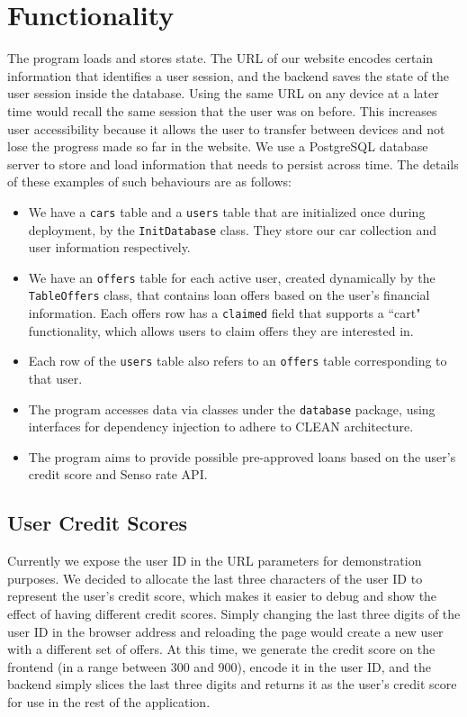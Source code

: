 \documentclass[fontsize=14pt]{article}
\begin{document}
\section*{Functionality}

The program loads and stores state. The URL of our website encodes certain information that identifies a user session, and the backend saves the state of the user session inside the database. Using the same URL on any device at a later time would recall the same session that the user was on before. This increases user accessibility because it allows the user to transfer between devices and not lose the progress made so far in the website. We use a PostgreSQL database server to store and load information that needs to persist across time.  
The details of these examples of such behaviours are as follows:   
\begin{itemize}
    \item We have a \texttt{cars} table and a \texttt{users} table that are initialized once during deployment, by the \texttt{InitDatabase} class. They store our car collection and user information respectively. 
    \item We have an \texttt{offers} table for each active user, created dynamically by the \texttt{TableOffers} class, that contains loan offers based on the user's financial information. Each offers row has a \texttt{claimed} field that supports a ``cart" functionality, which allows users to claim offers they are interested in.
    \item Each row of the \texttt{users} table also refers to an \texttt{offers} table corresponding to that user.
    \item The program accesses data via classes under the \texttt{database} package, using interfaces for dependency injection to adhere to CLEAN architecture.
    \item The program aims to provide possible pre-approved loans based on the user's credit score and Senso rate API.
\end{itemize}

\subsection*{User Credit Scores}
Currently we expose the user ID in the URL parameters for demonstration purposes. We decided to allocate the last three characters of the user ID to represent the user's credit score, which makes it easier to debug and show the effect of having different credit scores. Simply changing the last three digits of the user ID in the browser address and reloading the page would create a new user with a different set of offers. At this time, we generate the credit score on the frontend (in a range between 300 and 900), encode it in the user ID, and the backend simply slices the last three digits and returns it as the user's credit score for use in the rest of the application.
\end{document}
